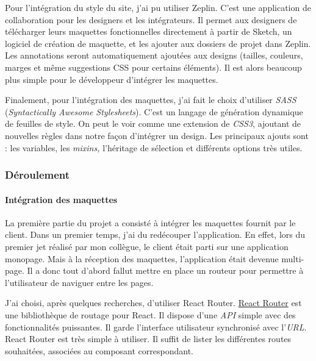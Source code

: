 \documentclass[12pt,a4paper]{article}
\begin{document}
  \bigskip

  Pour l'intégration du style du site, j'ai pu utiliser Zeplin. C'est une
  application de collaboration pour les designers et les intégrateurs. Il
  permet aux designers de télécharger leurs maquettes fonctionnelles
  directement à partir de Sketch, un logiciel de création de maquette, et
  les ajouter aux dossiers de projet dans Zeplin. Les annotations seront
  automatiquement ajoutées aux designs (tailles, couleurs, marges et même
  suggestions CSS pour certains éléments). Il est alors beaucoup plus
  simple pour le développeur d'intégrer les maquettes.

  \bigskip

  Finalement, pour l'intégration des maquettes, j'ai fait le choix
  d'utiliser \emph{SASS} (\emph{Syntactically Awesome Stylesheets}). C'est
  un langage de génération dynamique de feuilles de style. On peut le voir
  comme une extension de \emph{CSS3}, ajoutant de nouvelles règles dans
  notre façon d'intégrer un design. Les principaux ajouts sont : les
  variables, les \emph{mixins,} l'héritage de sélection et différents
  options très utiles.

  \bigskip

  \subsubsection{Déroulement}\label{duxe9roulement}

  \bigskip

  \paragraph{Intégration des
  maquettes}\label{intuxe9gration-des-maquettes}

  \bigskip

  La première partie du projet a consisté à intégrer les maquettes fournit
  par le client. Dans un premier temps, j'ai du redécouper l'application.
  En effet, lors du premier jet réalisé par mon collègue, le client était
  parti sur une application monopage. Mais à la réception des maquettes,
  l'application était devenue multi-page. Il a donc tout d'abord fallut
  mettre en place un routeur pour permettre à l'utilisateur de naviguer
  entre les pages.

  \bigskip

  J'ai choisi, après quelques recherches, d'utiliser React Router.
  \href{https://github.com/ReactTraining/react-router}{React Router} est
  une bibliothèque de routage pour React. Il dispose d'une \emph{API}
  simple avec des fonctionnalités puissantes. Il garde l'interface
  utilisateur synchronisé avec l'\emph{URL}. React Router est très simple
  à utiliser. Il suffit de lister les différentes routes souhaitées,
  associées au composant correspondant.
\end{document}
